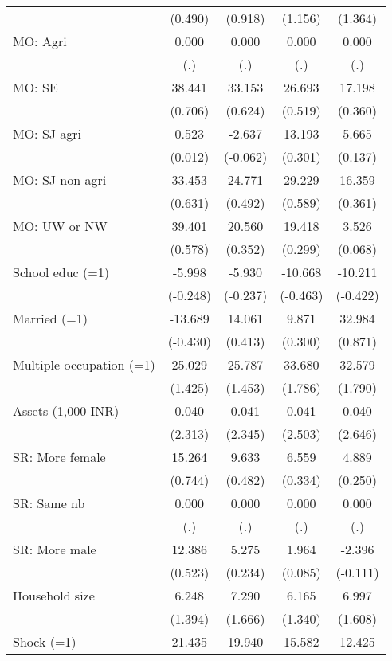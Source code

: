 \begin{table}[htbp]
{\begin{tabular}{lcccc}
          & (0.490) & (0.918) & (1.156) & (1.364) \\
    MO: Agri & 0.000 & 0.000 & 0.000 & 0.000 \\
          & (.)   & (.)   & (.)   & (.) \\
    MO: SE & 38.441 & 33.153 & 26.693 & 17.198 \\
          & (0.706) & (0.624) & (0.519) & (0.360) \\
    MO: SJ agri & 0.523 & -2.637 & 13.193 & 5.665 \\
          & (0.012) & (-0.062) & (0.301) & (0.137) \\
    MO: SJ non-agri & 33.453 & 24.771 & 29.229 & 16.359 \\
          & (0.631) & (0.492) & (0.589) & (0.361) \\
    MO: UW or NW & 39.401 & 20.560 & 19.418 & 3.526 \\
          & (0.578) & (0.352) & (0.299) & (0.068) \\
    School educ (=1) & -5.998 & -5.930 & -10.668 & -10.211 \\
          & (-0.248) & (-0.237) & (-0.463) & (-0.422) \\
    Married (=1) & -13.689 & 14.061 & 9.871 & 32.984 \\
          & (-0.430) & (0.413) & (0.300) & (0.871) \\
    Multiple occupation (=1) & 25.029 & 25.787 & 33.680 & 32.579 \\
          & (1.425) & (1.453) & (1.786) & (1.790) \\
    Assets (1,000 INR) & 0.040 & 0.041 & 0.041 & 0.040 \\
          & (2.313) & (2.345) & (2.503) & (2.646) \\
    SR: More female & 15.264 & 9.633 & 6.559 & 4.889 \\
          & (0.744) & (0.482) & (0.334) & (0.250) \\
    SR: Same nb & 0.000 & 0.000 & 0.000 & 0.000 \\
          & (.)   & (.)   & (.)   & (.) \\
    SR: More male & 12.386 & 5.275 & 1.964 & -2.396 \\
          & (0.523) & (0.234) & (0.085) & (-0.111) \\
    Household size & 6.248 & 7.290 & 6.165 & 6.997 \\
          & (1.394) & (1.666) & (1.340) & (1.608) \\
    Shock (=1) & 21.435 & 19.940 & 15.582 & 12.425 \\

\end{tabular}}
\end{table}
